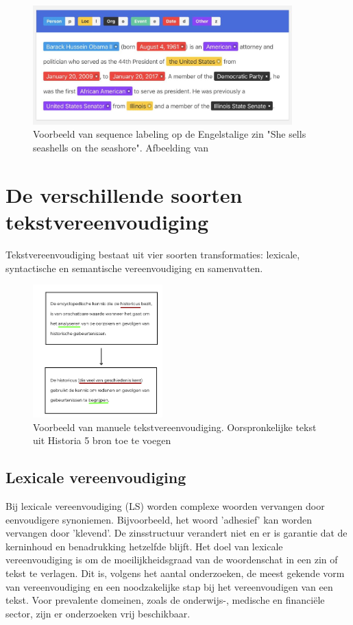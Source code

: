 \begin{figure}
	\begin{center}
		\includegraphics[width=10cm]{img/nerlabeling.jpg}
	\end{center}
	\caption{Voorbeeld van sequence labeling op de Engelstalige zin "She sells seashells on the seashore". Afbeelding van \textcite{Bilisci2021} }
	\label{fig:ner}
\end{figure}

\section{De verschillende soorten tekstvereenvoudiging}

Tekstvereenvoudiging bestaat uit vier soorten transformaties: lexicale, syntactische en semantische vereenvoudiging en samenvatten.

\begin{figure}
	\begin{center}
			\includegraphics[width=5cm]{img/voorbeeld-manuele-vereenvoudiging.png}
	\end{center}
	\caption{Voorbeeld van manuele tekstvereenvoudiging. Oorspronkelijke tekst uit Historia 5 bron toe te voegen}
\end{figure}

\subsection{Lexicale vereenvoudiging}

Bij lexicale vereenvoudiging (LS) worden complexe woorden vervangen door eenvoudigere synoniemen. Bijvoorbeeld, het woord 'adhesief' kan worden vervangen door 'klevend'. De zinsstructuur verandert niet en er is garantie dat de kerninhoud en benadrukking hetzelfde blijft. Het doel van lexicale vereenvoudiging is om de moeilijkheidsgraad van de woordenschat in een zin of tekst te verlagen. Dit is, volgens het aantal onderzoeken, de meest gekende vorm van vereenvoudiging en een noodzakelijke stap bij het vereenvoudigen van een tekst. Voor prevalente domeinen, zoals de onderwijs-, medische en financiële sector, zijn er onderzoeken vrij beschikbaar. 

